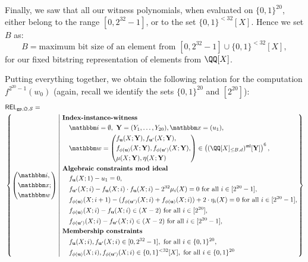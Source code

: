\documentclass[11pt,letterpaper,usenames,dvipsnames]{article}
\begin{document}
Finally, we saw that all our witness polynomials, when evaluated on $\{0,1\}^{20}$, either belong to the range $[0, 2^{32}-1]$, or to the set $\{0,1\}^{< 32}[X]$. Hence we set $B$ as:
%
$$
B=\text{maximum bit size of an element from } [0,2^{32}-1] \cup \{0,1\}^{< 32}[X],
$$
for our fixed bitstring representation of elements from $\QQ[X]$.

Putting everything together, we obtain the following relation for the computation $f^{2^{20}-1}(w_0)$ (again, recall we identify the sets $\{0,1\}^{20}$ and $[2^{20}]$):
  \begin{equation*}
  \begin{aligned}
  &\REL_{\gparams,\megaQ,\cS} =\\ &\left\{ \left(\begin{aligned}&\idx,\\ &\inp;\\ &\wit\end{aligned}\right) \left| \ \begin{aligned}
      &\textbf{Index-instance-witness}\\
  &\quad \idx = \emptyset, \ \YY=(Y_1,\ldots, Y_{20}), \inp =(u_1),\\    
      &\quad  \wit = \left(\begin{split}&f_{\uu}(X;\YY), f_{\uu'}(X;\YY),\\ &f_{\phi(\uu)}(X;\YY),  f_{\phi(\uu')}(X;\YY),\\ &\mu(X;\YY), \eta(X;\YY)\end{split}\right) \in \left(\mainQpolyringmultilin[\YY]\right)^{6},\\
      &\textbf{Algebraic constraints mod ideal}\\
      &\quad f_{\uu}(X;1)-u_1 = 0,\\
      &\quad f_{\uu'}(X; i) - f_{\uu}(X;i)\cdot f_{\uu}(X;i) - 2^{32} \mu_i(X) = 0 \text{ for all } i\in [2^{20}-1],\\
      &\quad f_{\phi(\uu)}(X; i+1) - (f_{\phi(\uu')}(X;i) + f_{\phi(\uu)}(X;i)) + 2\cdot \eta_i(X) =0 \text{ for all } i\in [2^{20}-1],\\
      &\quad f_{\phi(\uu)}(X;i)-f_{\uu}(X;i) \in (X-2)\text{ for all } i\in [2^{20}],\\
      &\quad f_{\phi(\uu')}(X;i)-f_{\uu'}(X;i) \in (X-2)\text{ for all } i\in [2^{20}-1],\\
      &\textbf{Membership constraints}\\
      &\quad  f_{\uu}(X;i), f_{\uu'}(X;i) \in [0,2^{32}-1], \text{ for all } i \in \{0,1\}^{20},\\ 
      &\quad f_{\phi(\uu)}(X;i), f_{\phi(\uu')}(X;i) \in \{0,1\}^{<32}[X],  \text{ for all } i \in \{0,1\}^{20}
  \end{aligned} \right.\right\}
  \end{aligned}
  \end{equation*}
\end{document}
